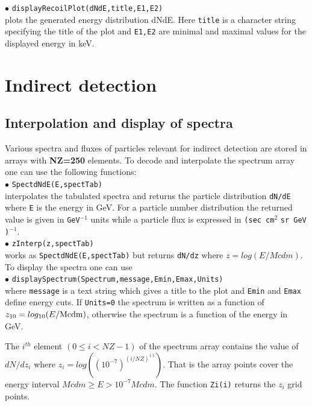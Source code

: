 \documentclass[12pt,a4paper]{article}
\begin{document}
\noindent
$\bullet$ \verb|displayRecoilPlot(dNdE,title,E1,E2)|\\
plots the  generated energy distribution dNdE. Here \verb|title|
is a character string specifying the title of the plot and
\verb|E1,E2| are minimal and maximal values for the displayed
energy in keV.

\section{Indirect detection}




\subsection{ Interpolation and display of spectra}
Various spectra and fluxes  of particles  relevant for indirect detection are stored in
arrays with {\bf NZ=250} elements. To decode and interpolate the spectrum array
one can use the following functions:\\
$\bullet$  \verb|SpectdNdE(E,spectTab)|\\
interpolates the tabulated spectra  and returns the 
particle distribution \verb|dN/dE|  where \verb|E| is the energy  in GeV. 
For a particle number  distribution the returned value is given in \verb|GeV|$^{-1}$
units while  a particle flux is expressed in \verb|(sec cm|$^2$ \verb|sr GeV )|$^{-1}$.\\
$\bullet$ \verb|zInterp(z,spectTab)| \\
works as \verb|SpectdNdE(E,spectTab)| but returns  \verb|dN/dz| where  $z=log(E/Mcdm)$.\\
To display the  spectra  one can use \\
$\bullet$ \verb|displaySpectrum(Spectrum,message,Emin,Emax,Units)|\\
where  \verb|message| is a text string which gives a title to the  
plot and  \verb|Emin| and \verb|Emax| define  energy cuts. If \verb|Units=0| the spectrum 
is written as a function of $z_{10}=log_{10}(E/{\rm {Mcdm}})$, otherwise the spectrum 
is a function of the energy in GeV. 


The $i^{th}$ element $(0\le i < NZ-1)$ of the spectrum array contains
the value of $dN/dz_i$ where $z_i=log\left((10^{-7})^{(i/NZ)^{1.5}}\right)$. That is the
array points cover the  energy interval  $ Mcdm \ge E > 10^{-7}Mcdm$. 
 The function \verb|Zi(i)|  returns the  $z_i$  grid points. 
\end{document}
